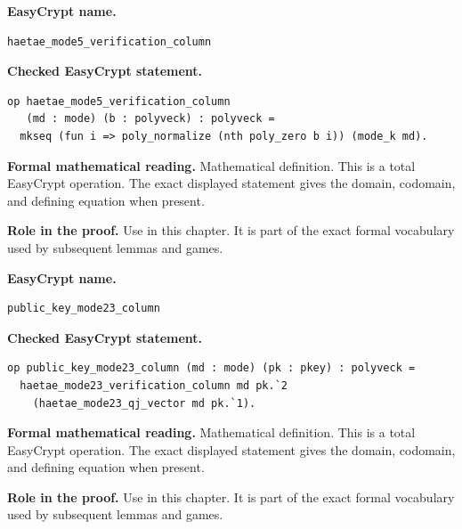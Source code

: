 \begin{formaldefinition}
\noindent\textbf{EasyCrypt name.}
\begin{lstlisting}[language=EasyCrypt,basicstyle=\ttfamily\scriptsize]
haetae_mode5_verification_column
\end{lstlisting}
\noindent\textbf{Checked EasyCrypt statement.}
\begin{lstlisting}[language=EasyCrypt,basicstyle=\ttfamily\scriptsize]
op haetae_mode5_verification_column
   (md : mode) (b : polyveck) : polyveck =
  mkseq (fun i => poly_normalize (nth poly_zero b i)) (mode_k md).
\end{lstlisting}
\noindent\textbf{Formal mathematical reading.}
Mathematical definition. This is a total EasyCrypt operation.  The exact displayed statement gives the domain, codomain, and defining equation when present.

\noindent\textbf{Role in the proof.}
Use in this chapter. It is part of the exact formal vocabulary used by subsequent lemmas and games.

\end{formaldefinition}

\begin{formaldefinition}
\noindent\textbf{EasyCrypt name.}
\begin{lstlisting}[language=EasyCrypt,basicstyle=\ttfamily\scriptsize]
public_key_mode23_column
\end{lstlisting}
\noindent\textbf{Checked EasyCrypt statement.}
\begin{lstlisting}[language=EasyCrypt,basicstyle=\ttfamily\scriptsize]
op public_key_mode23_column (md : mode) (pk : pkey) : polyveck =
  haetae_mode23_verification_column md pk.`2
    (haetae_mode23_qj_vector md pk.`1).
\end{lstlisting}
\noindent\textbf{Formal mathematical reading.}
Mathematical definition. This is a total EasyCrypt operation.  The exact displayed statement gives the domain, codomain, and defining equation when present.

\noindent\textbf{Role in the proof.}
Use in this chapter. It is part of the exact formal vocabulary used by subsequent lemmas and games.

\end{formaldefinition}

